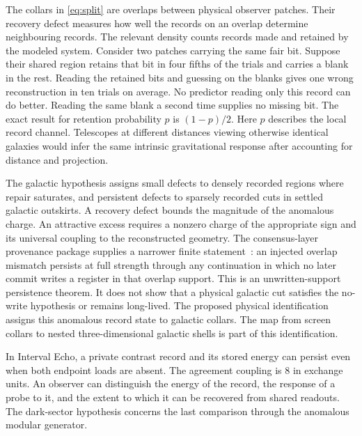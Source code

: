 \documentclass[11pt]{article}
\begin{document}
The collars in \eqref{eq:split} are overlaps between physical observer
patches. Their recovery defect measures how well the records on an
overlap determine neighbouring records. The relevant density counts
records made and retained by the modeled system. Consider two patches
carrying the same fair bit. Suppose their shared region retains that bit
in four fifths of the trials and carries a blank in the rest. Reading the
retained bits and guessing on the blanks gives one wrong reconstruction
in ten trials on average. No predictor reading only this record can do
better. Reading the same blank a second time supplies no missing bit.
The exact result for retention probability $p$ is $(1-p)/2$. Here $p$
describes the local record channel. Telescopes at different distances
viewing otherwise identical galaxies would infer the same intrinsic
gravitational response after accounting for distance and projection.

The galactic hypothesis assigns small defects to densely recorded
regions where repair saturates, and persistent defects to sparsely
recorded cuts in settled galactic outskirts. A recovery defect bounds
the magnitude of the anomalous charge. An attractive excess requires
a nonzero charge of the appropriate sign and its universal coupling
to the reconstructed geometry. The consensus-layer provenance package
supplies a narrower finite statement~\cite{ophconsensus}: an injected overlap
mismatch persists at full strength through any continuation in which no later
commit writes a register in that overlap support. This is an unwritten-support
persistence theorem. It does not show that a physical galactic cut satisfies
the no-write hypothesis or remains long-lived. The proposed physical
identification assigns this anomalous record state to galactic collars.
The map from screen collars to nested three-dimensional galactic shells is
part of this identification.

In Interval Echo, a private contrast record and its stored energy
can persist even when both endpoint loads are absent. The agreement
coupling is 8 in exchange units. An observer can distinguish the
energy of the record, the response of a probe to it, and the extent
to which it can be recovered from shared readouts. The dark-sector
hypothesis concerns the last comparison through the anomalous
modular generator.
\end{document}
